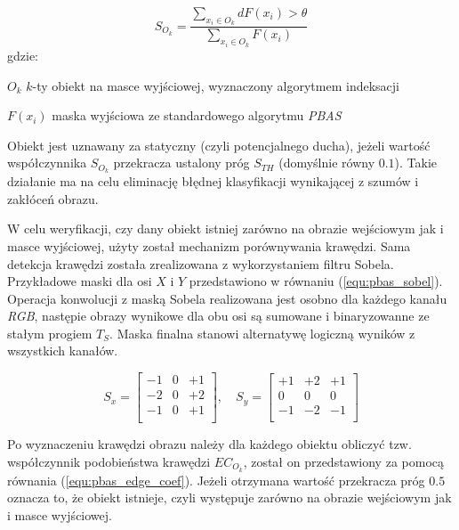     \begin{equation}
        S_{O_k} = \frac{ \sum_{x_i \in O_k} dF(x_i) > \theta }{ \sum_{x_i \in O_k} F(x_i) }
    \label{equ:pbas_stability}
    \end{equation}
gdzie:
\begin{eqwhere}[2cm]
	\item[$O_k$] $k$-ty obiekt na masce wyjściowej, wyznaczony algorytmem indeksacji
	\item[$F(x_i)$] maska wyjściowa ze standardowego algorytmu \textit{PBAS}
\end{eqwhere}

\noindent Obiekt jest uznawany za statyczny (czyli potencjalnego ducha), jeżeli wartość współczynnika $S_{O_k}$ przekracza ustalony próg $S_{TH}$ (domyślnie równy $0.1$). 
Takie działanie ma na celu eliminację błędnej klasyfikacji wynikającej z szumów i zakłóceń obrazu.


W celu weryfikacji, czy dany obiekt istniej zarówno na obrazie wejściowym jak i masce wyjściowej, użyty został mechanizm porównywania krawędzi.
Sama detekcja krawędzi została zrealizowana z wykorzystaniem filtru Sobela. 
Przykładowe maski dla osi $X$ i $Y$ przedstawiono w równaniu (\ref{equ:pbas_sobel}). 
Operacja konwolucji z maską Sobela realizowana jest osobno dla każdego kanału \textit{RGB}, następie obrazy wynikowe dla obu osi są sumowane i binaryzowanne ze stałym progiem $T_S$. 
Maska finalna stanowi alternatywę logiczną wyników z wszystkich kanałów.

    \begin{equation}
        S_x = \begin{bmatrix}
			    -1 & 0 & +1 \\
			    -2 & 0 & +2 \\
			    -1 & 0 & +1 \\
		    \end{bmatrix}
		,\quad 
		S_y = \begin{bmatrix}
			    +1 & +2 & +1 \\
			    0 & 0 & 0 \\
			    -1 & -2 & -1 \\
		    \end{bmatrix} 
    \label{equ:pbas_sobel}
    \end{equation}

Po wyznaczeniu krawędzi obrazu należy dla każdego obiektu obliczyć tzw. współczynnik podobieństwa krawędzi $EC_{O_k}$, został on przedstawiony za pomocą równania (\ref{equ:pbas_edge_coef}).  
Jeżeli otrzymana wartość przekracza próg $0.5$ oznacza to, że obiekt istnieje, czyli występuje zarówno na obrazie wejściowym jak i masce wyjściowej. 

